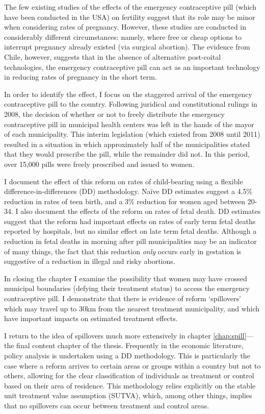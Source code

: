 The few existing studies of the effects of the emergency contraceptive pill
(which have been conducted in the USA) on fertility suggest that its role may be 
minor when considering rates of pregnancy.  However, these studies are conducted 
in considerably different circumstances: namely, where free or cheap options to
interrupt pregnancy already existed (via surgical abortion).  The evidence from 
Chile, however, suggests that in the absence of alternative post-coital 
technologies, the emergency contraceptive pill can act as an important technology 
in reducing rates of pregnancy in the short term.

In order to identify the effect, I focus on the staggered arrival of the 
emergency contraceptive pill to the country. Following juridical and 
constitutional rulings in 2008, the decision of whether or not to freely 
distribute the emergency contraceptive pill in municipal health centers was 
left in the hands of the mayor of each municipality. This interim legislation
(which existed from 2008 until 2011) resulted in a situation in which 
approximately half of the municipalities stated that they would prescribe the 
pill, while the remainder did not. In this period, over 15,000 pills were 
freely prescribed and issued to women.

I document the effect of this reform on rates of child-bearing using a flexible 
difference-in-differences (DD) methodology. Na\"ive DD estimates suggest a 4.5\% 
reduction in rates of teen birth, and a 3\% reduction for women aged between 
20-34.  I also document the effects of the reform on rates of fetal death.  DD 
estimates suggest that the reform had important effects on rates of early term 
fetal deaths reported by hospitals, but no similar effect on late term fetal 
deaths. Although a reduction in fetal deaths in morning after pill 
municipalities may be an indicator of many things, the fact that this reduction
\emph{only} occurs early in gestation is suggestive of a reduction in illegal
and risky abortions.

In closing the chapter I examine the possibility that women may have crossed
municipal boundaries (defying their treatment status) to access the emergency
contraceptive pill. I demonstrate that there is evidence of reform `spillovers'
which may travel up to 30km from the nearest treatment municipality, and which
have important impacts on estimated treatment effects.

I return to the idea of spillovers much more extensively in chapter 
\ref{chap:spill}---the final content chapter of the thesis.  Frequently in the
economic literature, policy analysis is undertaken using a DD methodology. This
is particularly the case where a reform arrives to certain areas or groups 
within a country but not to others, allowing for the clear classification of
individuals as treatment or control based on their area of residence.  This 
methodology relies explicitly on the stable unit treatment value assumption 
(SUTVA), which, among other things, implies that no spillovers can occur between 
treatment and control areas.
 
